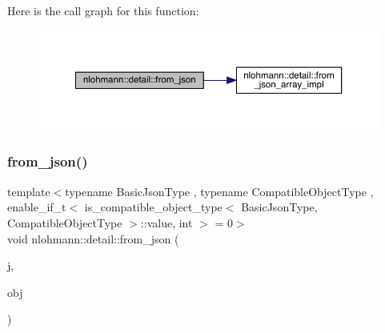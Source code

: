 Here is the call graph for this function\+:\nopagebreak
\begin{figure}[H]
\begin{center}
\leavevmode
\includegraphics[width=350pt]{namespacenlohmann_1_1detail_a8dcac00852dbe1f61d1e78135b19d428_cgraph}
\end{center}
\end{figure}
\mbox{\label{namespacenlohmann_1_1detail_a5e7a3674e8ac46f8feebad9712d7c55f}} 
\subsubsection{\texorpdfstring{from\_json()}{from\_json()}\hspace{0.1cm}{\footnotesize\ttfamily [10/11]}}
{\footnotesize\ttfamily template$<$typename Basic\+Json\+Type , typename Compatible\+Object\+Type , enable\+\_\+if\+\_\+t$<$ is\+\_\+compatible\+\_\+object\+\_\+type$<$ Basic\+Json\+Type, Compatible\+Object\+Type $>$\+::value, int $>$  = 0$>$ \\
void nlohmann\+::detail\+::from\+\_\+json (\begin{DoxyParamCaption}\item[{const Basic\+Json\+Type \&}]{j,  }\item[{Compatible\+Object\+Type \&}]{obj }\end{DoxyParamCaption})}

\mbox{\label{namespacenlohmann_1_1detail_a839b0ab50d2c9bce669068f56bc41202}} 

